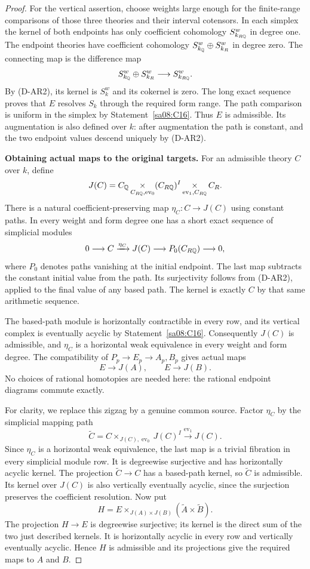 \begin{proof}
For the vertical assertion, choose weights large enough
for the finite-range comparisons of those three theories
and their interval cotensors. In each simplex the kernel
of both endpoints has only coefficient cohomology
$S_{k_{R\mathbb Q}}^w$ in degree one. The endpoint theories have
coefficient cohomology $S_{k_\mathbb Q}^w\oplus S_{k_R}^w$
in degree zero. The connecting map is the difference map
\[
 S_{k_\mathbb Q}^w\oplus S_{k_R}^w
       \longrightarrow S_{k_{R\mathbb Q}}^w.
\]
By (D-AR2), its kernel is $S_k^w$ and its cokernel is
zero. The long exact sequence proves that $E$ resolves
$S_k$ through the required form range. The path comparison
is uniform in the simplex by Statement~\ref{sa08:C16}.
Thus $E$ is admissible. Its augmentation is also defined
over $k$: after augmentation the path is constant, and
the two endpoint values descend uniquely by (D-AR2).

\par\medskip\noindent\textbf{Obtaining actual maps to the original targets.}
For an admissible theory $C$ over $k$, define
\[
 J(C)=C_\mathbb Q\mathop{\times}_{C_{R\mathbb Q},\operatorname{ev}_0}
       (C_{R\mathbb Q})^I
       \mathop{\times}_{\operatorname{ev}_1,C_{R\mathbb Q}}C_R.
\]
There is a natural coefficient-preserving map
$\eta_C\colon C\to J(C)$ using constant paths.
In every weight and form degree one has a short exact
sequence of simplicial modules
\[
 0\longrightarrow C\xrightarrow{\eta_C}J(C)
       \longrightarrow P_0(C_{R\mathbb Q})\longrightarrow0,
\]
where $P_0$ denotes paths vanishing at the initial endpoint.
The last map subtracts the constant initial value from the
path. Its surjectivity follows from (D-AR2), applied to
the final value of any based path. The kernel is exactly
$C$ by that same arithmetic sequence.

The based-path module is horizontally contractible in every
row, and its vertical complex is eventually acyclic by
Statement~\ref{sa08:C16}. Consequently $J(C)$ is admissible,
and $\eta_C$ is a horizontal weak equivalence in every
weight and form degree. The compatibility of
$P_p\to E_p\to A_p,B_p$ gives actual maps
\[
 E\longrightarrow J(A),\qquad E\longrightarrow J(B).
\]
No choices of rational homotopies are needed here: the
rational endpoint diagrams commute exactly.

For clarity, we replace this zigzag by a genuine common
source. Factor $\eta_C$ by the simplicial mapping path
\[
 \widetilde C=C\mathop{\times}_{J(C),\operatorname{ev}_0}
                     J(C)^I
       \xrightarrow{\operatorname{ev}_1}J(C).
\]
Since $\eta_C$ is a horizontal weak equivalence, the last
map is a trivial fibration in every simplicial module row.
It is degreewise surjective and has horizontally acyclic
kernel. The projection $\widetilde C\to C$ has a based-path
kernel, so $\widetilde C$ is admissible. Its kernel over
$J(C)$ is also vertically eventually acyclic, since the
surjection preserves the coefficient resolution.
Now put
\[
 H=E\mathop{\times}_{J(A)\times J(B)}
              (\widetilde A\times\widetilde B).
\]
The projection $H\to E$ is degreewise surjective; its
kernel is the direct sum of the two just described
kernels. It is horizontally acyclic in every row and
vertically eventually acyclic. Hence $H$ is admissible
and its projections give the required maps to $A$ and $B$.


\end{proof}
